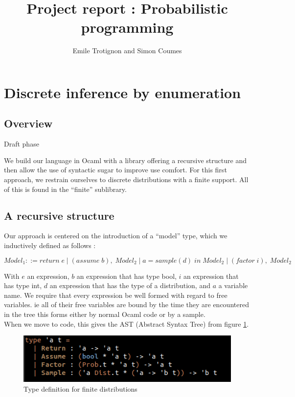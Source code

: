 \documentclass{article}
\title{Project report : Probabilistic programming}
\author{Emile Trotignon and Simon Coumes}
\newcommand\SC[1]{{\color{violet}{\it \bf Simon :} #1}}
\begin{document}
\maketitle

\section{Discrete inference by enumeration}

	\subsection{Overview}

	\SC{Draft phase}

	We build our language in Ocaml with a library offering a recursive structure and then allow the use of syntactic sugar to improve use comfort.
	For this first approach, we restrain ourselves to discrete distributions with a finite support. 
	All of this is found in the ``finite'' sublibrary.

	\subsection{A recursive structure}

	Our approach is centered on the introduction of a ``model'' type, which we inductively defined as follows : 


	\begin{equation}
	  Model_1 ::= return \; e \; | \; (assume \; b), \; Model_2 \; | \; a = sample(d) \; in \;Model_2 \; | \;  (factor \; i), \; Model_2
	  \label{eq:1}
	\end{equation}

	With $e$ an expression, $b$ an expression that has type bool, $i$ an expression that has type int, $d$ an expression that has the type of a distribution, and $a$ a variable name.
	We require that every expression be well formed with regard to free variables. ie all of their free variables are bound by the time they are encountered in the tree this forms either by normal Ocaml code or by a sample. \\

	When we move to code, this gives the AST (Abstract Syntax Tree) from figure \ref{fig:AST1}.
	\begin{figure}[h]
	  \centering
	  \includegraphics[scale=0.7]{images/AST1.png}
	  \caption{Type definition for finite distributions}
	  \label{fig:AST1}
	\end{figure}
	
\end{document}

